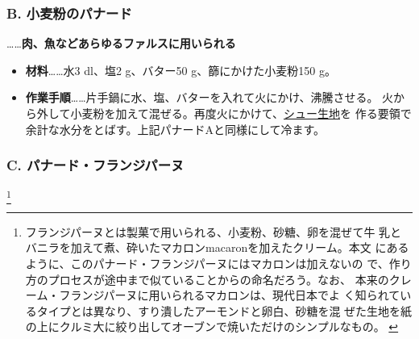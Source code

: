 \begin{recette}
\maeaki

\hypertarget{panade-b}{%
\subsubsection{B. 小麦粉のパナード}\label{panade-b}}



\ldots{}\ldots{}\textbf{肉、魚などあらゆるファルスに用いられる}

\begin{itemize}
\item
  \textbf{材料}\ldots{}\ldots{}水3 dl、塩2 g、バター50
  g、篩にかけた小麦粉150 g。
\item
  \textbf{作業手順}\ldots{}\ldots{}片手鍋に水、塩、バターを入れて火にかけ、沸騰させる。
  火から外して小麦粉を加えて混ぜる。再度火にかけて、\protect\hyperlink{}{シュー生地}を
  作る要領で余計な水分をとばす。上記パナードAと同様にして冷ます。
\end{itemize}

\maeaki

\hypertarget{panade-c}{%
\subsubsection{C. パナード・フランジパーヌ}\label{panade-c}}

\footnote{フランジパーヌとは製菓で用いられる、小麦粉、砂糖、卵を混ぜて牛
  乳とバニラを加えて煮、砕いたマカロンmacaronを加えたクリーム。本文
  にあるように、このパナード・フランジパーヌにはマカロンは加えないの
  で、作り方のプロセスが途中まで似ていることからの命名だろう。なお、
  本来のクレーム・フランジパーヌに用いられるマカロンは、現代日本でよ
  く知られているタイプとは異なり、すり潰したアーモンドと卵白、砂糖を混
  ぜた生地を紙の上にクルミ大に絞り出してオーブンで焼いただけのシンプルなもの。
  \href{macaron\%20craquelé（マカロンクラクレ）はこのタイプの代表的なもの。焼}{}
  \href{く際に膨らんで割れ目が出来ることからクラクレ（裂け目のある）の名称}{}
  \href{が付けられた。}{}}



\end{recette}

